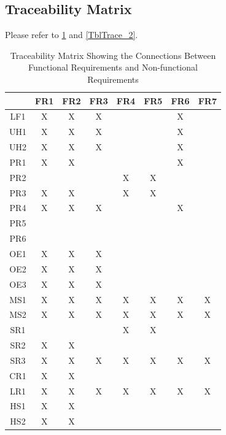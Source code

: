 \documentclass[12pt]{article}
\begin{document}
\subsection{Traceability Matrix}
Please refer to \ref{TblTrace_1} and \ref{TblTrace_2}.
\begin{table}[h!]
    \centering
    \begin{tabular}{|c|c|c|c|c|c|c|c|}
    \hline
        & FR1 & FR2 & FR3 & FR4 & FR5 & FR6 & FR7 \\
    \hline
    LF1 & X & X & X & & & X &   \\ \hline
    UH1 & X & X & X & & & X &   \\ \hline
    UH2 & X & X & X & & & X &   \\ \hline
    PR1 & X & X & & & & X &   \\ \hline
    PR2 & & & & X & X & &   \\ \hline
    PR3 & X & X & & X & X & &   \\ \hline
    PR4 & X & X & X & & & X &   \\ \hline
    PR5 & & & & & & &   \\ \hline
    PR6 & & & & & & &   \\ \hline
    OE1 & X & X & X & & & &   \\ \hline
    OE2 & X & X & X & & & &   \\ \hline
    OE3 & X & X & X & & & &   \\ \hline
    MS1 & X & X & X & X & X & X & X   \\ \hline
    MS2 & X & X & X & X & X & X & X   \\ \hline
    SR1 & & & & X & X & &   \\ \hline
    SR2 & X & X & & & & &   \\ \hline
    SR3 & X & X & X & X & X & X & X \\ \hline
    CR1 & X & X & & & & &   \\ \hline
    LR1 & X & X & X & X & X & X & X \\ \hline
    HS1 & X & X & & & & &   \\ \hline
    HS2 & X & X & & & & &   \\ \hline
    \end{tabular}
    \caption{Traceability Matrix Showing the Connections Between Functional Requirements and Non-functional Requirements} \label{TblTrace_1}
\end{table}
\end{document}
